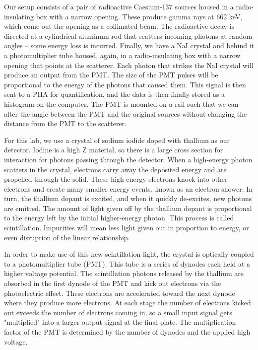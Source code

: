 \documentclass{article}
\begin{document}
Our setup consists of a pair of radioactive Caesium-137 sources housed in a radio-insulating box with a narrow opening. These produce gamma rays at 662 keV, which come out the opening as a collimated beam. The radioactive decay is directed at a cylindrical aluminum rod that scatters incoming photons at random angles – some energy loss is incurred. Finally, we have a NaI crystal and behind it a photomultiplier tube housed, again, in a radio-insulating box with a narrow opening that points at the scatterer. Each photon that strikes the NaI crystal will produce an output from the PMT. The size of the PMT pulses will be proportional to the energy of the photons that caused them. This signal is then sent to a PHA for quantification, and the data is then finally stored as a histogram on the computer. The PMT is mounted on a rail such that we can alter the angle between the PMT and the original sources without changing the distance from the PMT to the scatterer.

\hspace{.25cm}

For this lab, we use a crystal of sodium iodide doped with thallium as our detector. Iodine is a high Z material, so there is a large cross section for interaction for photons passing through the detector. When a high-energy photon scatters in the crystal, electrons carry away the deposited energy and are propelled through the solid. These high energy electrons knock into other electrons and create many smaller energy events, known as an electron shower. In turn, the thallium dopant is excited, and when it quickly de-excites, new photons are emitted. The amount of light given off by the thallium dopant is proportional to the energy left by the initial higher-energy photon. This process is called scintillation. Impurities will mean less light given out in proportion to energy, or even disruption of the linear relationship.

In order to make use of this new scintillation light, the crystal is optically coupled to a photomultiplier tube (PMT). This tube is a series of dynodes each held at a higher voltage potential. The scintillation photons released by the thallium are absorbed in the first dynode of the PMT and kick out electrons via the photoelectric effect. These electrons are accelerated toward the next dynode where they produce more electrons.  At each stage the number of electrons kicked out exceeds the number of electrons coming in, so a small input signal gets "multiplied" into a larger output signal at the final plate. The multiplication factor of the PMT is determined by the number of dynodes and the applied high voltage.
\end{document}
